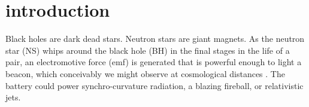   





\section{introduction}
Black holes are dark dead stars. Neutron stars are giant magnets. As
the neutron star (NS) whips around the black hole (BH) in the final
stages in the life of a pair, an electromotive force (emf) is
generated that is powerful enough to light a beacon, which conceivably we
might observe at cosmological distances
\citep{McL:2011,DL:2013}. The battery could power
synchro-curvature radiation, a blazing fireball, or relativistic jets.


